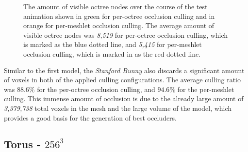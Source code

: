   \begin{figure}[h]            %
    \begin{center}
      \caption{The amount of visible octree nodes over the course of the test animation shown in green for 
      per-octree occlusion culling and in orange for per-meshlet occlusion culling. 
      The average amount of visible octree nodes was \emph{8,519} for per-octree occlusion culling, which is 
      marked as the blue dotted line, and \emph{5,415} for per-meshlet occlusion culling, which is marked in 
      as the red dotted line.}
      \label{plt:bunny-256-culling-res-nodes}
    \end{center}
  \end{figure}
 

\noindent
Similar to the first model, the \emph{Stanford Bunny} also discards a significant amount of 
voxels in both of the applied culling configurations. The average culling ratio was $88.6\%$ 
for the per-octree occlusion culling, and $94.6\%$ for the per-meshlet culling. This immense 
amount of occlusion is due to the already large amount of \emph{3,379,738} total voxels in the 
mesh and the large volume of the model, which provides a good basis for the generation of best 
occluders. \\



\subsection*{Torus - $256^3$}

